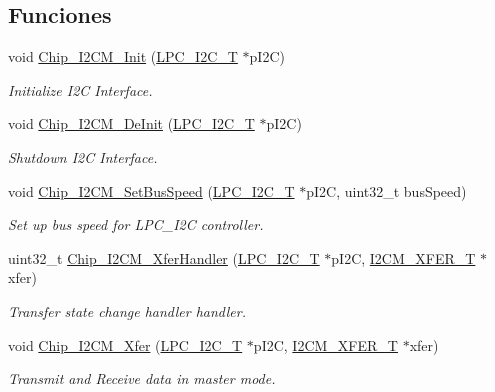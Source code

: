 \subsection*{Funciones}
\begin{DoxyCompactItemize}
\item 
void \hyperlink{group___i2_c_m__18_x_x__43_x_x_gaa54fd5277f67ad6a319f010ee47107be}{Chip\+\_\+\+I2\+C\+M\+\_\+\+Init} (\hyperlink{struct_l_p_c___i2_c___t}{L\+P\+C\+\_\+\+I2\+C\+\_\+T} $\ast$p\+I2C)
\begin{DoxyCompactList}\small\item\em Initialize I2C Interface. \end{DoxyCompactList}\item 
void \hyperlink{group___i2_c_m__18_x_x__43_x_x_gaf4c9d08157514e8cc0d2bf4a870e85c5}{Chip\+\_\+\+I2\+C\+M\+\_\+\+De\+Init} (\hyperlink{struct_l_p_c___i2_c___t}{L\+P\+C\+\_\+\+I2\+C\+\_\+T} $\ast$p\+I2C)
\begin{DoxyCompactList}\small\item\em Shutdown I2C Interface. \end{DoxyCompactList}\item 
void \hyperlink{group___i2_c_m__18_x_x__43_x_x_ga741eebe9ada749637e7ee24bf1f7f392}{Chip\+\_\+\+I2\+C\+M\+\_\+\+Set\+Bus\+Speed} (\hyperlink{struct_l_p_c___i2_c___t}{L\+P\+C\+\_\+\+I2\+C\+\_\+T} $\ast$p\+I2C, uint32\+\_\+t bus\+Speed)
\begin{DoxyCompactList}\small\item\em Set up bus speed for L\+P\+C\+\_\+\+I2C controller. \end{DoxyCompactList}\item 
uint32\+\_\+t \hyperlink{group___i2_c_m__18_x_x__43_x_x_ga75095468463ed3ce0eb368165537780b}{Chip\+\_\+\+I2\+C\+M\+\_\+\+Xfer\+Handler} (\hyperlink{struct_l_p_c___i2_c___t}{L\+P\+C\+\_\+\+I2\+C\+\_\+T} $\ast$p\+I2C, \hyperlink{struct_i2_c_m___x_f_e_r___t}{I2\+C\+M\+\_\+\+X\+F\+E\+R\+\_\+T} $\ast$xfer)
\begin{DoxyCompactList}\small\item\em Transfer state change handler handler. \end{DoxyCompactList}\item 
void \hyperlink{group___i2_c_m__18_x_x__43_x_x_gad4b7e6761dd2450e45463a5acef9ee1a}{Chip\+\_\+\+I2\+C\+M\+\_\+\+Xfer} (\hyperlink{struct_l_p_c___i2_c___t}{L\+P\+C\+\_\+\+I2\+C\+\_\+T} $\ast$p\+I2C, \hyperlink{struct_i2_c_m___x_f_e_r___t}{I2\+C\+M\+\_\+\+X\+F\+E\+R\+\_\+T} $\ast$xfer)
\begin{DoxyCompactList}\small\item\em Transmit and Receive data in master mode. \end{DoxyCompactList}\item 

\end{DoxyCompactItemize}
